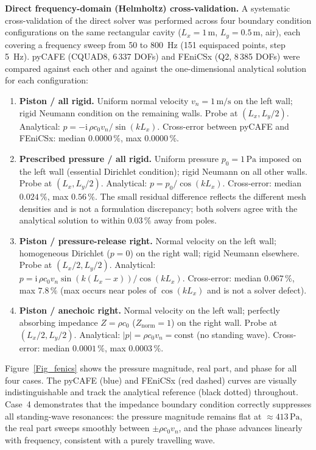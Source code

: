 \documentclass{jors}
\begin{document}
\textbf{Direct frequency-domain (Helmholtz) cross-validation.} A systematic cross-validation of the direct solver was performed across four boundary condition configurations on the same rectangular cavity ($L_x = 1\,\text{m}$, $L_y = 0.5\,\text{m}$, air), each covering a frequency sweep from 50 to 800~Hz (151 equispaced points, step 5~Hz). pyCAFE (CQUAD8, 6\,337 DOFs) and FEniCSx (Q2, 8\,385 DOFs) were compared against each other and against the one-dimensional analytical solution for each configuration:

\begin{enumerate}
  \item \textbf{Piston / all rigid.} Uniform normal velocity $v_n = 1\,\text{m/s}$ on the left wall; rigid Neumann condition on the remaining walls. Probe at $(L_x, L_y/2)$. Analytical: $p = -\mathrm{i}\,\rho c_0 v_n / \sin(k L_x)$. Cross-error between pyCAFE and FEniCSx: median $0.0000\,\%$, max $0.0000\,\%$.
  \item \textbf{Prescribed pressure / all rigid.} Uniform pressure $p_0 = 1\,\text{Pa}$ imposed on the left wall (essential Dirichlet condition); rigid Neumann on all other walls. Probe at $(L_x, L_y/2)$. Analytical: $p = p_0 / \cos(k L_x)$. Cross-error: median $0.024\,\%$, max $0.56\,\%$. The small residual difference reflects the different mesh densities and is not a formulation discrepancy; both solvers agree with the analytical solution to within $0.03\,\%$ away from poles.
  \item \textbf{Piston / pressure-release right.} Normal velocity on the left wall; homogeneous Dirichlet ($p = 0$) on the right wall; rigid Neumann elsewhere. Probe at $(L_x/2, L_y/2)$. Analytical: $p = \mathrm{i}\,\rho c_0 v_n \sin(k(L_x - x)) / \cos(k L_x)$. Cross-error: median $0.067\,\%$, max $7.8\,\%$ (max occurs near poles of $\cos(kL_x)$ and is not a solver defect).
  \item \textbf{Piston / anechoic right.} Normal velocity on the left wall; perfectly absorbing impedance $Z = \rho c_0$ ($Z_\text{norm} = 1$) on the right wall. Probe at $(L_x/2, L_y/2)$. Analytical: $|p| = \rho c_0 v_n = \text{const}$ (no standing wave). Cross-error: median $0.0001\,\%$, max $0.0003\,\%$.
\end{enumerate}

Figure~\ref{Fig_fenics} shows the pressure magnitude, real part, and phase for all four cases. The pyCAFE (blue) and FEniCSx (red dashed) curves are visually indistinguishable and track the analytical reference (black dotted) throughout. Case~4 demonstrates that the impedance boundary condition correctly suppresses all standing-wave resonances: the pressure magnitude remains flat at $\approx413\,\text{Pa}$, the real part sweeps smoothly between $\pm\rho c_0 v_n$, and the phase advances linearly with frequency, consistent with a purely travelling wave.
\end{document}
